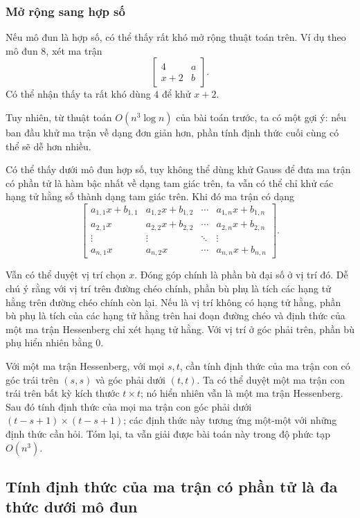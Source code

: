 \documentclass[11pt]{article}
\begin{document}
\subsubsection{Mở rộng sang hợp số}

Nếu mô đun là hợp số, có thể thấy rất khó mở rộng thuật toán trên. Ví dụ theo mô
đun \(8\), xét ma trận
\[
  \begin{bmatrix}
    4 & a\\
    x+2 & b
  \end{bmatrix}.
\]
Có thể nhận thấy ta rất khó dùng \(4\) để khử \(x+2\).

Tuy nhiên, từ thuật toán \(O(n^3\log n)\) của bài toán trước, ta có một gợi ý:
nếu ban đầu khử ma trận về dạng đơn giản hơn, phần tính định thức cuối cùng có
thể sẽ dễ hơn nhiều.

Có thể thấy dưới mô đun hợp số, tuy không thể dùng khử Gauss để đưa ma trận có
phần tử là hàm bậc nhất về dạng tam giác trên, ta vẫn có thể chỉ khử các hạng tử
hằng số thành dạng tam giác trên. Khi đó ma trận có dạng
\[
  \begin{bmatrix}
  a_{1,1}x+b_{1,1} & a_{1,2}x+b_{1,2} & \cdots & a_{1,n}x+b_{1,n}\\
  a_{2,1}x & a_{2,2}x+b_{2,2} & \cdots & a_{2,n}x+b_{2,n}\\
  \vdots & \vdots & \ddots & \vdots\\
  a_{n,1}x & a_{n,2}x & \cdots & a_{n,n}x+b_{n,n}
  \end{bmatrix}.
\]

Vẫn có thể duyệt vị trí chọn \(x\). Đóng góp chính là phần bù đại số ở vị trí
đó. Dễ chú ý rằng với vị trí trên đường chéo chính, phần bù phụ là tích các hạng
tử hằng trên đường chéo chính còn lại. Nếu là vị trí không có hạng tử hằng, phần
bù phụ là tích của các hạng tử hằng trên hai đoạn đường chéo và định thức của
một ma trận Hessenberg chỉ xét hạng tử hằng. Với vị trí ở góc phải trên, phần bù
phụ hiển nhiên bằng \(0\).

Với một ma trận Hessenberg, với mọi \(s,t\), cần tính định thức của ma trận con
có góc trái trên \((s,s)\) và góc phải dưới \((t,t)\). Ta có thể duyệt một ma
trận con trái trên bất kỳ kích thước \(t\times t\); nó hiển nhiên vẫn là một ma
trận Hessenberg. Sau đó tính định thức của mọi ma trận con góc phải dưới
\((t-s+1)\times(t-s+1)\); các định thức này tương ứng một-một với những định
thức cần hỏi. Tóm lại, ta vẫn giải được bài toán này trong độ phức tạp
\(O(n^3)\).

\subsection{Tính định thức của ma trận có phần tử là đa thức dưới mô đun}
\end{document}
